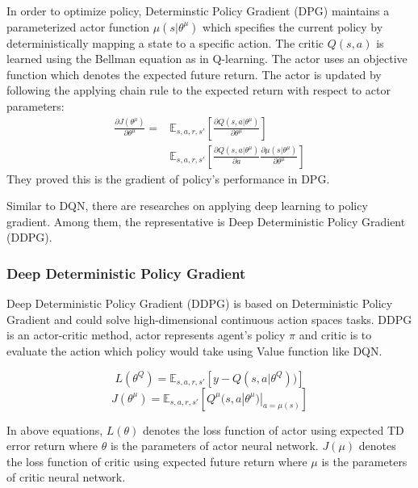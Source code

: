 \documentclass[11pt,twocolumn]{jarticle} %
\begin{document}
In order to optimize policy, Determinstic Policy Gradient (DPG) maintains a parameterized actor function $\mu(s|\theta^\mu)$ which specifies the current policy by deterministically mapping a state to a specific action. The critic $Q(s, a)$ is learned using the Bellman equation as in Q-learning. The actor uses an objective function which denotes the expected future return. The actor is updated by following the applying chain rule to the expected return with respect to actor parameters:
\begin{equation}
\label{dpg_prove}
\begin{split}
\frac{\partial J(\theta^\mu)}{\partial \theta^\mu} = 
& \mathbb{E}_{s,a,r,s'}[\frac{\partial Q(s, a|\theta^\mu)}{\partial \theta^\mu}] \\
& \mathbb{E}_{s,a,r,s'}[\frac{\partial Q(s, a|\theta^\mu)}{\partial a} \frac{\partial \mu(s|\theta^\mu)}{\partial \theta^\mu}]
\end{split}
\end{equation}
They proved this is the gradient of policy's performance in DPG\cite{dpg}. \par

Similar to DQN, there are researches on applying deep learning to policy gradient. Among them, the representative is Deep Deterministic Policy Gradient (DDPG)\cite{ddpg}. 

\subsubsection{Deep Deterministic Policy Gradient\cite{ddpg}}
Deep Deterministic Policy Gradient (DDPG) is based on Deterministic Policy Gradient\cite{dpg} and could solve high-dimensional continuous action spaces tasks. DDPG is an actor-critic method, actor represents agent's policy $\pi$ and critic is to evaluate the action which policy would take using Value function like DQN. 

\begin{equation}
L(\theta^Q) = \mathbb{E}_{s,a,r,s'}[y - Q(s, a|\theta^Q))] 
\end{equation}
\begin{equation}
J(\theta^\mu) = \mathbb{E}_{s,a,r,s'}[Q^\mu(s, a|\theta^\mu) | _{a=\mu(s)}]
\end{equation}

In above equations, $L(\theta)$ denotes the loss function of actor using expected TD error return where $\theta$ is the parameters of actor neural network. $J(\mu)$ denotes the loss function of critic using expected future return where $\mu$ is the parameters of critic neural network. \par
\end{document}
